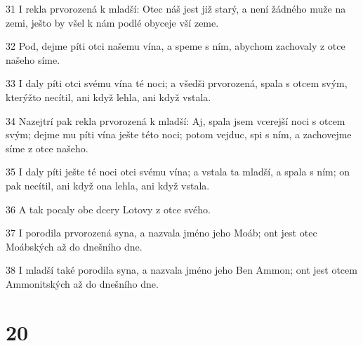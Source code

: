 \par 31 I rekla prvorozená k mladší: Otec náš jest již starý, a není žádného muže na zemi, ješto by všel k nám podlé obyceje vší zeme.
\par 32 Pod, dejme píti otci našemu vína, a speme s ním, abychom zachovaly z otce našeho síme.
\par 33 I daly píti otci svému vína té noci; a všedši prvorozená, spala s otcem svým, kterýžto necítil, ani když lehla, ani když vstala.
\par 34 Nazejtrí pak rekla prvorozená k mladší: Aj, spala jsem vcerejší noci s otcem svým; dejme mu píti vína ješte této noci; potom vejduc, spi s ním, a zachovejme síme z otce našeho.
\par 35 I daly píti ješte té noci otci svému vína; a vstala ta mladší, a spala s ním; on pak necítil, ani když ona lehla, ani když vstala.
\par 36 A tak pocaly obe dcery Lotovy z otce svého.
\par 37 I porodila prvorozená syna, a nazvala jméno jeho Moáb; ont jest otec Moábských až do dnešního dne.
\par 38 I mladší také porodila syna, a nazvala jméno jeho Ben Ammon; ont jest otcem Ammonitských až do dnešního dne.

\chapter{20}

